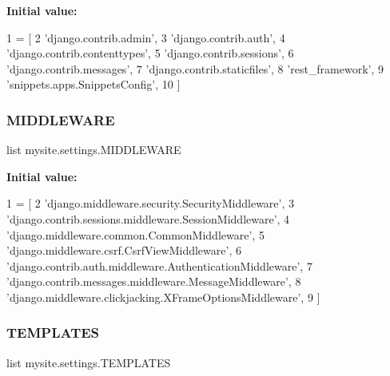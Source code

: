 {\bfseries Initial value\+:}
\begin{DoxyCode}
1 =  [
2     \textcolor{stringliteral}{'django.contrib.admin'},
3     \textcolor{stringliteral}{'django.contrib.auth'},
4     \textcolor{stringliteral}{'django.contrib.contenttypes'},
5     \textcolor{stringliteral}{'django.contrib.sessions'},
6     \textcolor{stringliteral}{'django.contrib.messages'},
7     \textcolor{stringliteral}{'django.contrib.staticfiles'},
8     \textcolor{stringliteral}{'rest\_framework'}, 
9     \textcolor{stringliteral}{'snippets.apps.SnippetsConfig'},
10 ]
\end{DoxyCode}
\mbox{\label{namespacemysite_1_1settings_a90df4fc7c17f07da22241f9ceb21f3b9}} 
\subsubsection{\texorpdfstring{M\+I\+D\+D\+L\+E\+W\+A\+RE}{MIDDLEWARE}}
{\footnotesize\ttfamily list mysite.\+settings.\+M\+I\+D\+D\+L\+E\+W\+A\+RE}

{\bfseries Initial value\+:}
\begin{DoxyCode}
1 =  [
2     \textcolor{stringliteral}{'django.middleware.security.SecurityMiddleware'},
3     \textcolor{stringliteral}{'django.contrib.sessions.middleware.SessionMiddleware'},
4     \textcolor{stringliteral}{'django.middleware.common.CommonMiddleware'},
5     \textcolor{stringliteral}{'django.middleware.csrf.CsrfViewMiddleware'},
6     \textcolor{stringliteral}{'django.contrib.auth.middleware.AuthenticationMiddleware'},
7     \textcolor{stringliteral}{'django.contrib.messages.middleware.MessageMiddleware'},
8     \textcolor{stringliteral}{'django.middleware.clickjacking.XFrameOptionsMiddleware'},
9 ]
\end{DoxyCode}
\mbox{\label{namespacemysite_1_1settings_a073a410822eed069da826d807a904fff}} 
\subsubsection{\texorpdfstring{T\+E\+M\+P\+L\+A\+T\+ES}{TEMPLATES}}
{\footnotesize\ttfamily list mysite.\+settings.\+T\+E\+M\+P\+L\+A\+T\+ES}

